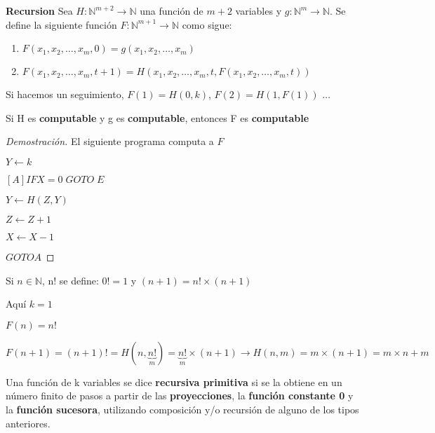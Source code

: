 \begin{definition}
\textbf{Recursion} Sea $H \colon \mathbb{N}^{m + 2} \rightarrow \mathbb{N}$ una funci\'on de $m + 2$ variables y $g \colon \mathbb{N}^{m} \rightarrow \mathbb{N}$. Se define la siguiente funci\'on $F \colon \mathbb{N}^{m + 1} \rightarrow \mathbb{N}$ como sigue:
 
\begin{enumerate}
	\item $F(x_1, x_2, \ldots, x_m, 0) = g(x_1, x_2, \ldots, x_m)$
	\item $F(x_1, x_2, \ldots, x_m, t + 1) = H(x_1, x_2, \ldots, x_m, t, F(x_1, x_2, \ldots, x_m, t))$
\end{enumerate}
 
Si hacemos un seguimiento, $F(1) = H(0, k)$, $F(2) = H(1, F(1))$ $\ldots$
 
\end{definition}
 
\begin{theorem}
Si H es \textbf{computable} y g es \textbf{computable}, entonces F es \textbf{computable}
\end{theorem}
 
\begin{proof}[Demostraci\'on]
El siguiente programa computa a $F$
 
$Y \leftarrow k$
 
$[A] IF X = 0 \; GOTO \; E$
 
$Y \leftarrow H(Z, Y)$
 
$Z \leftarrow Z + 1$
 
$X \leftarrow X - 1$
 
$GOTO A$
\end{proof}
 
\begin{example}
Si $n \in \mathbb{N}$, n! se define: $0! = 1$ y $(n + 1) = n! \times (n + 1)$
 
Aqu\'i $k = 1$
 
$F(n) = n!$
 
$F(n + 1) = (n + 1)! = H(n, \underbrace{n!}_{m}) = \underbrace{n!}_{m}\times(n + 1) \rightarrow H(n, m) = m \times (n + 1) = m \times n + m$
\end{example}
 
\begin{definition}
Una funci\'on de k variables se dice \textbf{recursiva primitiva} si se la obtiene en un n\'umero finito de pasos a partir de las \textbf{proyecciones}, la \textbf{funci\'on constante 0} y la \textbf{funci\'on sucesora}, utilizando composici\'on y/o recursi\'on de alguno de los tipos anteriores.
\end{definition}
 
